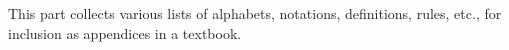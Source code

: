 \documentclass[../../include/open-logic-part]{subfiles}
\begin{document}

\begin{editorial}
  This part collects various lists of alphabets, notations,
  definitions, rules, etc., for inclusion as appendices in a textbook.
\end{editorial}



\OLEndPartHook
\end{document}
